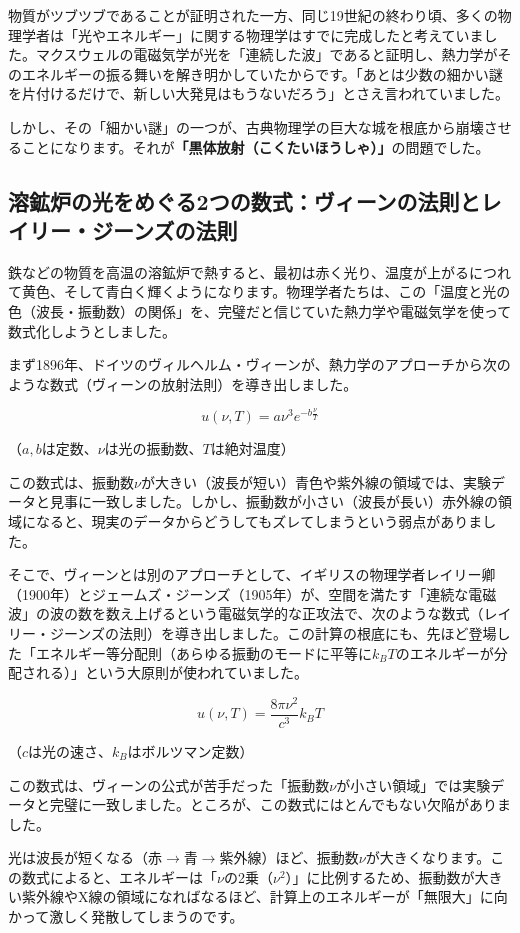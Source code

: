 物質がツブツブであることが証明された一方、同じ19世紀の終わり頃、多くの物理学者は「光やエネルギー」に関する物理学はすでに完成したと考えていました。マクスウェルの電磁気学が光を「連続した波」であると証明し、熱力学がそのエネルギーの振る舞いを解き明かしていたからです。「あとは少数の細かい謎を片付けるだけで、新しい大発見はもうないだろう」とさえ言われていました。

しかし、その「細かい謎」の一つが、古典物理学の巨大な城を根底から崩壊させることになります。それが\textbf{「黒体放射（こくたいほうしゃ）」}の問題でした。

\subsection{溶鉱炉の光をめぐる2つの数式：ヴィーンの法則とレイリー・ジーンズの法則}

鉄などの物質を高温の溶鉱炉で熱すると、最初は赤く光り、温度が上がるにつれて黄色、そして青白く輝くようになります。物理学者たちは、この「温度と光の色（波長・振動数）の関係」を、完璧だと信じていた熱力学や電磁気学を使って数式化しようとしました。

まず1896年、ドイツのヴィルヘルム・ヴィーンが、熱力学のアプローチから次のような数式（ヴィーンの放射法則）を導き出しました。

\[u(\nu, T) = a \nu^3 e^{-b\frac{\nu}{T}}\]

（\(a, b\)は定数、\(\nu\)は光の振動数、\(T\)は絶対温度）

この数式は、振動数\(\nu\)が大きい（波長が短い）青色や紫外線の領域では、実験データと見事に一致しました。しかし、振動数が小さい（波長が長い）赤外線の領域になると、現実のデータからどうしてもズレてしまうという弱点がありました。

そこで、ヴィーンとは別のアプローチとして、イギリスの物理学者レイリー卿（1900年）とジェームズ・ジーンズ（1905年）が、空間を満たす「連続な電磁波」の波の数を数え上げるという電磁気学的な正攻法で、次のような数式（レイリー・ジーンズの法則）を導き出しました。この計算の根底にも、先ほど登場した「エネルギー等分配則（あらゆる振動のモードに平等に\(k_B T\)のエネルギーが分配される）」という大原則が使われていました。

\[u(\nu, T) = \frac{8\pi \nu^2}{c^3} k_B T\]

（\(c\)は光の速さ、\(k_B\)はボルツマン定数）

この数式は、ヴィーンの公式が苦手だった「振動数\(\nu\)が小さい領域」では実験データと完璧に一致しました。ところが、この数式にはとんでもない欠陥がありました。

光は波長が短くなる（赤\(\rightarrow\)青\(\rightarrow\)紫外線）ほど、振動数\(\nu\)が大きくなります。この数式によると、エネルギーは「\(\nu\)の2乗（\(\nu^2\)）」に比例するため、振動数が大きい紫外線やX線の領域になればなるほど、計算上のエネルギーが「無限大」に向かって激しく発散してしまうのです。

